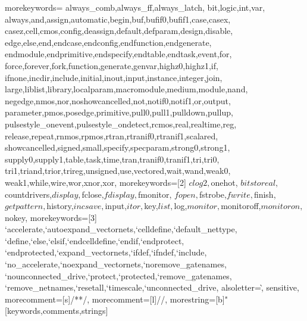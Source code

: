 %
  {morekeywords={%
      always_comb,always_ff,always_latch,%
      bit,logic,int,var,%
      always,and,assign,automatic,begin,buf,bufif0,bufif1,case,casex,%
      casez,cell,cmos,config,deassign,default,defparam,design,disable,%
      edge,else,end,endcase,endconfig,endfunction,endgenerate,%
      endmodule,endprimitive,endspecify,endtable,endtask,event,for,%
      force,forever,fork,function,generate,genvar,highz0,highz1,if,%
      ifnone,incdir,include,initial,inout,input,instance,integer,join,%
      large,liblist,library,localparam,macromodule,medium,module,nand,%
      negedge,nmos,nor,noshowcancelled,not,notif0,notif1,or,output,%
      parameter,pmos,posedge,primitive,pull0,pull1,pulldown,pullup,%
      pulsestyle_onevent,pulsestyle_ondetect,rcmos,real,realtime,reg,%
      release,repeat,rnmos,rpmos,rtran,rtranif0,rtranif1,scalared,%
      showcancelled,signed,small,specify,specparam,strong0,strong1,%
      supply0,supply1,table,task,time,tran,tranif0,tranif1,tri,tri0,%
      tri1,triand,trior,trireg,unsigned,use,vectored,wait,wand,weak0,%
      weak1,while,wire,wor,xnor,xor},%
   morekeywords=[2]{%
      $clog2,$onehot,%
      $bitstoreal,$countdrivers,$display,$fclose,$fdisplay,$fmonitor,%
      $fopen,$fstrobe,$fwrite,$finish,$getpattern,$history,$incsave,%
      $input,$itor,$key,$list,$log,$monitor,$monitoroff,$monitoron,%
      $nokey},%
   morekeywords=[3]{%
      `accelerate,`autoexpand_vectornets,`celldefine,`default_nettype,%
      `define,`else,`elsif,`endcelldefine,`endif,`endprotect,%
      `endprotected,`expand_vectornets,`ifdef,`ifndef,`include,%
      `no_accelerate,`noexpand_vectornets,`noremove_gatenames,%
      `nounconnected_drive,`protect,`protected,`remove_gatenames,%
      `remove_netnames,`resetall,`timescale,`unconnected_drive},%
   alsoletter=\`,%
   sensitive,%
   morecomment=[s]{/*}{*/},%
   morecomment=[l]//,%
   morestring=[b]"%
  }[keywords,comments,strings]%

\usepackage{graphicx}
\graphicspath{{../img/}}
\usepackage{tikz}
\usetikzlibrary{shapes, shapes.arrows}

\usepackage{amsmath}
\usepackage{amssymb}
\usepackage{mathtools}
\newcommand{\indep}{\perp\!\!\!\perp} %
\newcommand{\nindep}{\centernot{\indep}} %
\newcommand{\nimplies}{\centernot{\implies}} %
\newcommand{\niff}{\centernot{\iff}} %
\newcommand{\G}{\mathcal{G}} %
\newcommand{\E}{\mathcal{E}} %
\newcommand{\V}{\mathcal{V}} %
\newcommand{\reals}{\mathbb{R}}
\newcommand{\rationals}{\mathbb{Q}}
\newcommand{\integers}{\mathbb{Z}}
\newcommand{\naturals}{\mathbb{N}}
\newcommand{\complex}{\mathbb{C}}
\renewcommand{\Re}{\operatorname{Re}}
\renewcommand{\Im}{\operatorname{Im}}
\renewcommand{\vec}[1]{\mathbf{#1}} %
\newcommand{\transpose}[1]{{#1}^\mathrm{T}}

